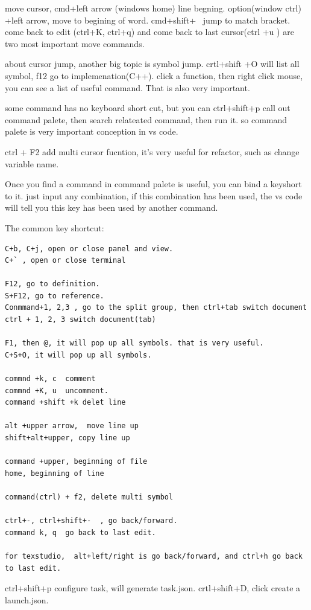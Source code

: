 \documentclass[paper=8.5in:11in, twoside, 12pt, pagesize=pdftex]{book}
\begin{document}
move cursor, cmd+left arrow (windows home)  line begning.  option(window ctrl) +left arrow, move to begining of word. cmd+shift+ \ jump to match bracket.  come back to edit (ctrl+K, ctrl+q) and come back to last cursor(ctrl +u ) are two most important move commands. 
	
about cursor jump, another big topic is symbol jump. crtl+shift +O will list all symbol,  f12 go to implemenation(C++). click a function, then right click mouse, you can see a list of useful command.  That is also very important. 
	
some command has no keyboard short cut, but you can ctrl+shift+p call out command palete, then search relateated command, then run it.  so command palete is very important conception in vs code. 
	
ctrl + F2 add multi cursor fucntion, it's very useful for refactor, such as change variable name. 
	
Once you find a command in command palete is useful, you can bind a keyshort to it.  just input any combination, if this combination has been used,  the vs code will tell you this key has been used by another command. 
	
The common key shortcut:

\begin{lstlisting}[]
C+b, C+j, open or close panel and view. 
C+` , open or close terminal

F12, go to definition. 
S+F12, go to reference. 
Conmmand+1, 2,3 , go to the split group, then ctrl+tab switch document
ctrl + 1, 2, 3 switch document(tab)

F1, then @, it will pop up all symbols. that is very useful.
C+S+O, it will pop up all symbols. 

commnd +k, c  comment
commnd +K, u  uncomment.
command +shift +k delet line

alt +upper arrow,  move line up
shift+alt+upper, copy line up

command +upper, beginning of file
home, beginning of line

command(ctrl) + f2, delete multi symbol

ctrl+-, ctrl+shift+-  , go back/forward. 
command k, q  go back to last edit.

for texstudio,  alt+left/right is go back/forward, and ctrl+h go back to last edit.
\end{lstlisting}



ctrl+shift+p configure task, will generate task.json. crtl+shift+D, click create a launch.json. 
\end{document}
